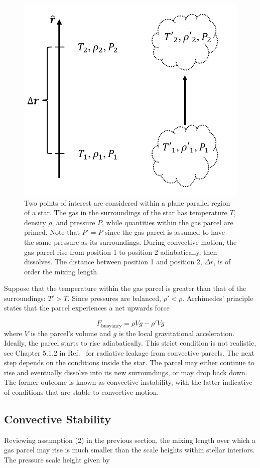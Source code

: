 \documentclass[12pt]{article}
\begin{document}
\begin{figure}[H]
    \centering
    \includegraphics[width=0.5\linewidth]{Appendices//Convec Transport/convection.png}
    \caption{Two points of interest are considered within a plane parallel region of a star. The gas in the surroundings of the star has temperature $T$, density $\rho$, and pressure $P$, while quantities within the gas parcel are primed. Note that $P' = P$ since the gas parcel is assumed to have the same pressure as its surroundings. During convective motion, the gas parcel rise from position 1 to position 2 adiabatically, then dissolves. The distance between position 1 and position 2, $\Delta r$, is of order the mixing length.}
    \label{fig:convec_diagram}
\end{figure}

Suppose that the temperature within the gas parcel is greater than that of the surroundings: $T' > T$. Since pressures are balanced, $\rho' < \rho$. Archimedes' principle states that the parcel experiences a net upwards force

\begin{equation}
    F_\mathrm{buoyancy} = \rho V g - \rho' V g
\end{equation}
%
where  $V$ is the parcel's volume and $g$ is the local gravitational acceleration. Ideally, the parcel starts to rise adiabatically. This strict condition is not realistic, see Chapter 5.1.2 in Ref.~\cite{HK_book} for radiative leakage from convective parcels. The next step depends on the conditions inside the star. The parcel may either continue to rise and eventually dissolve into its new surroundings, or may drop back down. The former outcome is known as convective instability, with the latter indicative of conditions that are stable to convective motion.

\subsection{Convective Stability} \label{ap:convec_stability}
Reviewing assumption (2) in the previous section, the mixing length over which a gas parcel may rise is much smaller than the scale heights within stellar interiors. The pressure scale height given by
\end{document}
